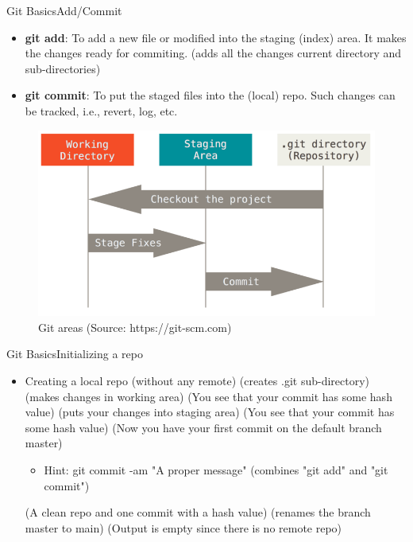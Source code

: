 \begin{frame}{Git Basics}{Add/Commit}
  \begin{itemize}
    \item \textbf{git add}: To add a new file or modified into the staging (index) area. It makes 
      the changes ready for commiting.
       (adds all the changes current directory and sub-directories)
    \item \textbf{git commit}: To put the staged files into the (local) repo. Such changes can be tracked, i.e.,
      revert, log, etc.
  \end{itemize}
  \begin{figure}
    \begin{center}
    \includegraphics[width=0.55\linewidth]{pics/areas.png}
    \vspace{-0.3cm}
    \caption{\footnotesize Git areas (Source: https://git-scm.com)}
  \end{center}
\end{figure}
\end{frame}

\begin{frame}{Git Basics}{Initializing a repo}
  \begin{itemize}
    \item Creating a local repo (without any remote)
     (creates .git sub-directory)
     (makes changes in  working area)
     (You see that your commit has some hash value)
     (puts your changes into staging area)
     (You see that your commit has some hash value)
     (Now you have your first commit on the default branch master)
    \begin{itemize}
      \item Hint:
      {\tiny {\color{blue}git commit -am "A proper message"} (combines "git add" and "git commit")}
    \end{itemize}
     (A clean repo and one commit with a hash value)
     (renames the branch master to main)
     (Output is empty since there is no remote repo)
  \end{itemize}
\end{frame}


